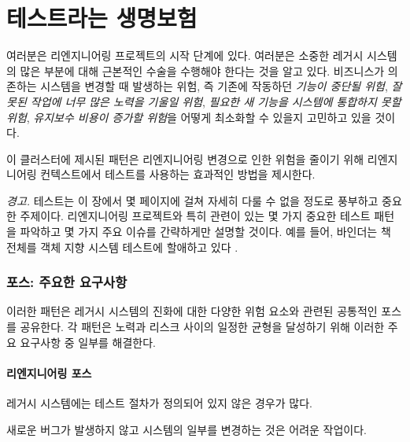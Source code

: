 \documentclass[a4paper,10pt,twoside]{book}
\begin{document}
	\renewcommand{\nnbb}[2]{} %
	\sloppy
\fi
\chapter{테스트라는 생명보험}

여러분은 리엔지니어링 프로젝트의 시작 단계에 있다. 여러분은 소중한 레거시 시스템의 많은 부분에 대해 근본적인 수술을 수행해야 한다는 것을 알고 있다. 비즈니스가 의존하는 시스템을 변경할 때 발생하는 위험, 즉 기존에 작동하던 \emph{기능이 중단될 위험}, \emph{잘못된 작업에 너무 많은 노력을 기울일 위험}, \emph{필요한 새 기능을 시스템에 통합하지 못할 위험}, \emph{유지보수 비용이 증가할 위험}을 어떻게 최소화할 수 있을지 고민하고 있을 것이다.

이 클러스터에 제시된 패턴은 리엔지니어링 변경으로 인한 위험을 줄이기 위해 리엔지니어링 컨텍스트에서 테스트를 사용하는 효과적인 방법을 제시한다.

\noindent
\emph{경고.}
테스트는 이 장에서 몇 페이지에 걸쳐 자세히 다룰 수 없을 정도로 풍부하고 중요한 주제이다. 리엔지니어링 프로젝트와 특히 관련이 있는 몇 가지 중요한 테스트 패턴을 파악하고 몇 가지 주요 이슈를 간략하게만 설명할 것이다. 예를 들어, 바인더는 책 전체를 객체 지향 시스템 테스트에 할애하고 있다 \cite{Bind99a}.

\subsection*{포스: 주요한 요구사항}

이러한 패턴은 레거시 시스템의 진화에 대한 다양한 위험 요소와 관련된 공통적인 포스를 공유한다. 각 패턴은 노력과 리스크 사이의 일정한 균형을 달성하기 위해 이러한 주요 요구사항 중 일부를 해결한다.

\subsubsection*{리엔지니어링 포스}

\begin{bulletlist}
\item 레거시 시스템에는 테스트 절차가 정의되어 있지 않은 경우가 많다.

\item 새로운 버그가 발생하지 않고 시스템의 일부를 변경하는 것은 어려운 작업이다.
\end{bulletlist}
\end{document}
